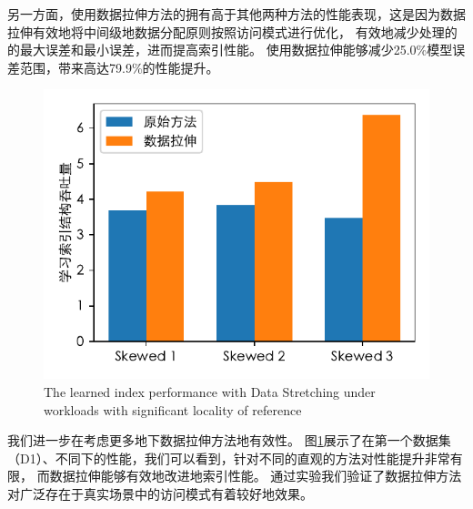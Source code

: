 
另一方面，使用数据拉伸方法的{\li}拥有高于其他两种方法的性能表现，这是因为数据拉伸有效地将{\rmi}中间级{\model}地数据分配原则按照访问模式进行优化，
有效地减少处理{\hotkey}的{\model}的最大误差和最小误差，进而提高索引性能。
使用数据拉伸能够减少25.0\%模型误差范围，带来高达79.9\%的性能提升。

\begin{figure}[!htp]
  \centering
  \includegraphics{figure/stretching-result.pdf}
    {The learned index performance with Data Stretching under workloads with significant locality of reference}
  \label{fig:stretch-result}
\end{figure}

我们进一步在考虑更多地{\skewwl}下数据拉伸方法地有效性。
图\ref{fig:stretch-result}展示了在第一个数据集（D1）、不同{\skewwl}下{\li}的性能，我们可以看到，针对不同的{\skewwl}直观的方法对性能提升非常有限，
而数据拉伸能够有效地改进{\li}地索引性能。
通过实验我们验证了数据拉伸方法对广泛存在于真实场景中的访问模式有着较好地效果。

